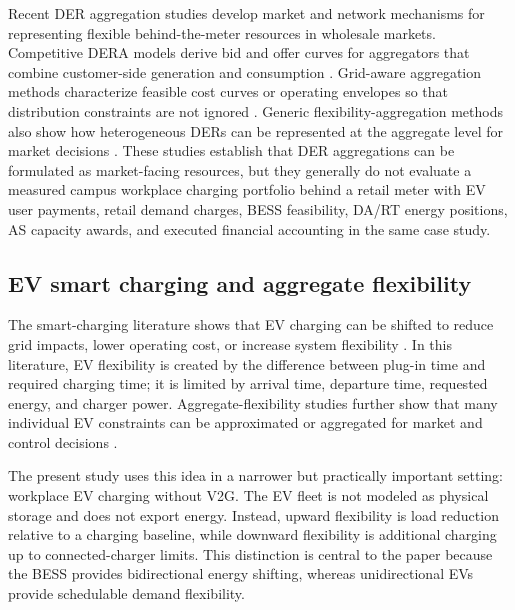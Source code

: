 \documentclass[final,5p,times]{elsarticle}
\begin{document}
Recent DER aggregation studies develop market and network mechanisms for representing flexible behind-the-meter resources in wholesale markets. Competitive DERA models derive bid and offer curves for aggregators that combine customer-side generation and consumption \cite{chen2023competitiveDER}. Grid-aware aggregation methods characterize feasible cost curves or operating envelopes so that distribution constraints are not ignored \cite{cui2022gridaware,chen2022dsoDERA}. Generic flexibility-aggregation methods also show how heterogeneous DERs can be represented at the aggregate level for market decisions \cite{muller2017aggregation}. These studies establish that DER aggregations can be formulated as market-facing resources, but they generally do not evaluate a measured campus workplace charging portfolio behind a retail meter with EV user payments, retail demand charges, BESS feasibility, DA/RT energy positions, AS capacity awards, and executed financial accounting in the same case study.

\subsection{EV smart charging and aggregate flexibility}
The smart-charging literature shows that EV charging can be shifted to reduce grid impacts, lower operating cost, or increase system flexibility \cite{clement2010impact,sortomme2011optimal,gan2013optimal,richardson2013electric,mwasilu2014electric}. In this literature, EV flexibility is created by the difference between plug-in time and required charging time; it is limited by arrival time, departure time, requested energy, and charger power. Aggregate-flexibility studies further show that many individual EV constraints can be approximated or aggregated for market and control decisions \cite{alTaha2022aggregateFlex,nazari2022updated}.

The present study uses this idea in a narrower but practically important setting: workplace EV charging without V2G. The EV fleet is not modeled as physical storage and does not export energy. Instead, upward flexibility is load reduction relative to a charging baseline, while downward flexibility is additional charging up to connected-charger limits. This distinction is central to the paper because the BESS provides bidirectional energy shifting, whereas unidirectional EVs provide schedulable demand flexibility.
\end{document}
